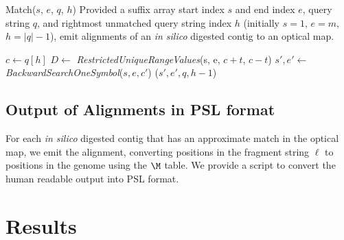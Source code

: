 \documentclass[doctor]{thesis}
\begin{document}
\begin{algorithm}[t]
\caption{{\sc Match}($s$, $e$, $q$, $h$) Provided a suffix array start index $s$ and end index $e$, query string $q$, and rightmost unmatched query string index $h$ (initially $s=1$, $e=m$, $h=|q| - 1$), emit alignments of an \emph{in silico} digested contig to an optical map.}
\label{match}
\begin{algorithmic}

  \State {}
\Else
  \State {}
  \State $c \leftarrow q[h]$ 
  \State {}
  \State $D \leftarrow$ \emph{RestrictedUniqueRangeValues}(s, e, $c + t$, $c - t$) 
  \State {}
    \State {}
    \State {}
    \State $s', e' \leftarrow$ \emph{BackwardSearchOneSymbol}($s,e,c'$) 
      \State {}
      ($s', e', q, h - 1$) 
    \EndIf
  \EndFor
\EndIf
\EndProcedure
\end{algorithmic}
\end{algorithm}


   
\subsection{Output of Alignments in PSL format}
For each {\em in silico} digested contig that has an approximate match in the optical map, we emit the alignment, converting positions in the fragment string $\ell$ to positions in the genome using the $\M$ table. We provide a script to convert the human readable output into PSL format.  
\makeatletter{}\section{Results}\label{sec-results}
\end{document}
